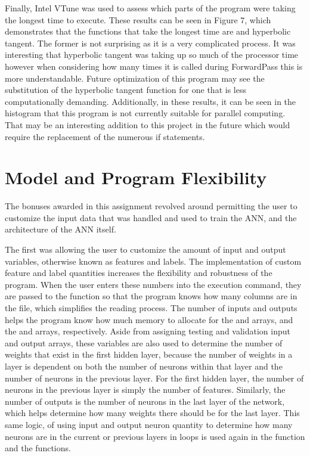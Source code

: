 \documentclass[12pt]{article}
\begin{document}
Finally, Intel VTune was used to assess which parts of the program were taking the longest time to execute. These results can be seen in Figure 7, which demonstrates that the functions that take the longest time are  and hyperbolic tangent. The former is not surprising as it is a very complicated process. It was interesting that hyperbolic tangent was taking up so much of the processor time however when considering how many times it is called during ForwardPass this is more understandable. Future optimization of this program may see the substitution of the hyperbolic tangent function for one that is less computationally demanding. Additionally, in these results, it can be seen in the histogram that this program is not currently suitable for parallel computing. That may be an interesting addition to this project in the future which would require the replacement of the numerous if statements.

\section{Model and Program Flexibility}

The bonuses awarded in this assignment revolved around permitting the user to customize the input data that was handled and used to train the ANN, and the architecture of the ANN itself. 

The first was allowing the user to customize the amount of input and output variables, otherwise known as features and labels. The implementation of custom feature and label quantities increases the flexibility and robustness of the program. When the user enters these numbers into the execution command, they are passed to the function  so that the program knows how many columns are in the file, which simplifies the reading process. The number of inputs and outputs helps the program know how much memory to allocate for the  and  arrays, and the  and  arrays, respectively. Aside from assigning testing and validation input and output arrays, these variables are also used to determine the number of weights that exist in the first hidden layer, because the number of weights in a layer is dependent on both the number of neurons within that layer and the number of neurons in the previous layer. For the first hidden layer, the number of neurons in the previous layer is simply the number of features. Similarly, the number of outputs is the number of neurons in the last layer of the network, which helps determine how many weights there should be for the last layer. This same logic, of using input and output neuron quantity to determine how many neurons are in the current or previous layers in  loops is used again in the  function and the  functions. 
\end{document}
